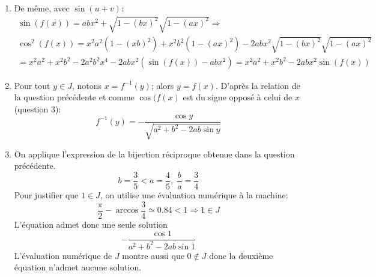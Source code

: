 \begin{enumerate}
  \item De même, avec $\sin(u+v)$:
\begin{multline*}
  \sin(f(x)) = abx^2 +\sqrt{1-(bx)^2}\sqrt{1-(ax)^2}\Rightarrow\\
\cos^2(f(x)) = x^2a^2(1-(xb)^2) + x^2b^2(1-(ax)^2) -2abx^2\sqrt{1-(bx)^2}\sqrt{1-(ax)^2}\\
= x^2a^2 + x^2b^2 -2a^2b^2x^4 -2abx^2\left(\sin(f(x))-abx^2 \right) 
= x^2a^2 + x^2b^2 -2abx^2 \sin(f(x))
\end{multline*}

  \item Pour tout $y\in J$, notons $x=f^{-1}(y)$; alors $y=f(x)$. D'après la relation de la question précédente et comme $\cos(f(x)$ est du signe opposé à celui de $x$ (question 3):
\begin{displaymath}
f^{-1}(y) = -\frac{\cos y}{\sqrt{a^2 + b^2 -2ab \sin y}}
\end{displaymath}

  \item On applique l'expression de la bijection réciproque obtenue dans la question précédente.
\begin{displaymath}
  b = \frac{3}{5} < a = \frac{4}{5}, \; \frac{b}{a} = \frac{3}{4}
\end{displaymath}
Pour justifier que $1\in J$, on utilise une évaluation numérique à la machine:
\begin{displaymath}
  \frac{\pi}{2} - \arccos\frac{3}{4} \simeq 0.84 < 1 \Rightarrow 1 \in J
\end{displaymath}
L'équation admet donc une seule solution
\begin{displaymath}
  -\frac{\cos 1}{a^2 + b^2 -2ab \sin 1}
\end{displaymath}
L'évaluation numérique de $J$ montre aussi que $0\notin J$ donc la deuxième équation n'admet aucune solution.

\end{enumerate}
